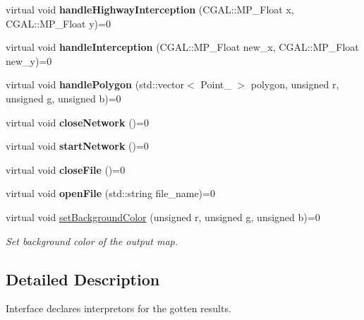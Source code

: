 \begin{DoxyCompactItemize}
\hypertarget{class_i_interpretable_a19891b709c0b9610ee7e0bc6cfacfa2e}{}\label{class_i_interpretable_a19891b709c0b9610ee7e0bc6cfacfa2e} 
virtual void {\bfseries handle\+Highway\+Interception} (C\+G\+A\+L\+::\+M\+P\+\_\+\+Float x, C\+G\+A\+L\+::\+M\+P\+\_\+\+Float y)=0
\item 
\hypertarget{class_i_interpretable_aa4cdcc0ed84340a98edcdccb1b7b0832}{}\label{class_i_interpretable_aa4cdcc0ed84340a98edcdccb1b7b0832} 
virtual void {\bfseries handle\+Interception} (C\+G\+A\+L\+::\+M\+P\+\_\+\+Float new\+\_\+x, C\+G\+A\+L\+::\+M\+P\+\_\+\+Float new\+\_\+y)=0
\item 
\hypertarget{class_i_interpretable_a8be21dc53a269a2f063dedbef82a5324}{}\label{class_i_interpretable_a8be21dc53a269a2f063dedbef82a5324} 
virtual void {\bfseries handle\+Polygon} (std\+::vector$<$ Point\+\_ $>$ polygon, unsigned r, unsigned g, unsigned b)=0
\item 
\hypertarget{class_i_interpretable_a303b1a1d5b4a8161b3ac949a242d9edd}{}\label{class_i_interpretable_a303b1a1d5b4a8161b3ac949a242d9edd} 
virtual void {\bfseries close\+Network} ()=0
\item 
\hypertarget{class_i_interpretable_a43563bf724954090b618c66a865643fe}{}\label{class_i_interpretable_a43563bf724954090b618c66a865643fe} 
virtual void {\bfseries start\+Network} ()=0
\item 
\hypertarget{class_i_interpretable_aa020c43e83d17a5faa60c7c4d53ebcb5}{}\label{class_i_interpretable_aa020c43e83d17a5faa60c7c4d53ebcb5} 
virtual void {\bfseries close\+File} ()=0
\item 
\hypertarget{class_i_interpretable_a5b7e79c4251dcc50783e1c11b71c6b8c}{}\label{class_i_interpretable_a5b7e79c4251dcc50783e1c11b71c6b8c} 
virtual void {\bfseries open\+File} (std\+::string file\+\_\+name)=0
\item 
\hypertarget{class_i_interpretable_a5a176aa42f975513e3b5bf030c7f34b4}{}\label{class_i_interpretable_a5a176aa42f975513e3b5bf030c7f34b4} 
virtual void \hyperlink{class_i_interpretable_a5a176aa42f975513e3b5bf030c7f34b4}{set\+Background\+Color} (unsigned r, unsigned g, unsigned b)=0
\begin{DoxyCompactList}\small\item\em Set background color of the output map. \end{DoxyCompactList}\end{DoxyCompactItemize}


\subsection{Detailed Description}
Interface declares interpretors for the gotten results. 

